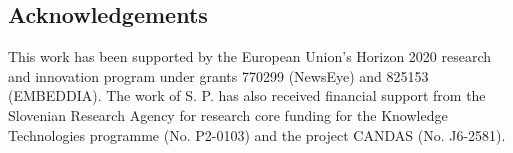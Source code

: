 \documentclass[runningheads]{llncs}
\begin{document}
\subsection*{Acknowledgements}
This work has been supported by the European Union's Horizon 2020 research and innovation program under grants 770299 (NewsEye) and 825153 (EMBEDDIA). The work of S. P. has also received financial support from the Slovenian Research Agency for research core funding for the Knowledge Technologies programme  (No. P2-0103) and the project CANDAS (No. J6-2581).






\end{document}
